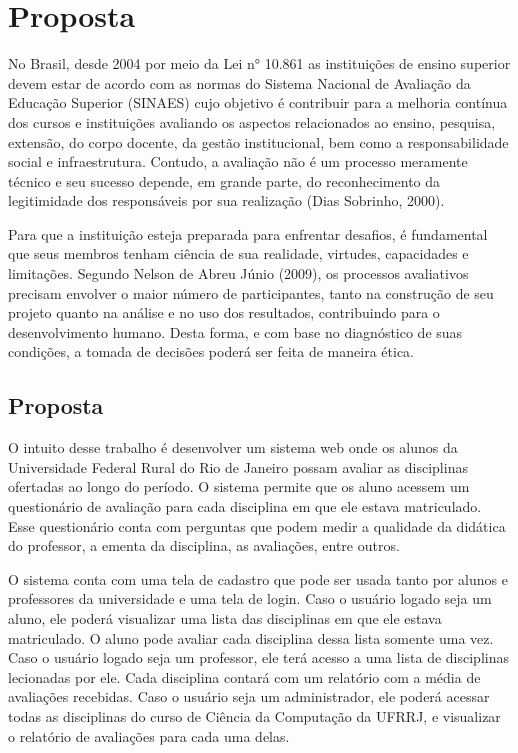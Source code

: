 \chapter{Proposta}\label{chp:PROPOSTA}

No Brasil, desde 2004 por meio da Lei n° 10.861 as instituições de ensino superior devem estar de acordo com as normas do Sistema Nacional de Avaliação da Educação Superior (SINAES)
cujo objetivo é contribuir para a melhoria contínua dos cursos e instituições avaliando 
os aspectos relacionados ao ensino, pesquisa, extensão, do corpo docente, da gestão institucional, bem como a responsabilidade social e infraestrutura.
Contudo, a avaliação não é um processo meramente técnico e seu sucesso depende, em grande parte, do reconhecimento da legitimidade dos responsáveis por sua realização (Dias Sobrinho, 2000). 

Para que a instituição esteja preparada para enfrentar desafios, é fundamental que seus membros tenham ciência de sua realidade, virtudes, capacidades e limitações.
Segundo Nelson de Abreu Júnio (2009), os processos avaliativos precisam envolver o maior número de participantes, tanto na construção de seu projeto quanto na análise e no uso dos resultados, contribuindo para o desenvolvimento humano. Desta forma, e com base no diagnóstico de suas condições, a tomada de decisões poderá ser feita de maneira ética.


\section{Proposta}
O intuito desse trabalho é desenvolver um sistema web onde os alunos da Universidade Federal Rural do Rio de Janeiro possam avaliar as disciplinas ofertadas ao longo do período. O sistema permite que os aluno acessem um questionário de avaliação para cada disciplina em que ele estava matriculado. Esse questionário conta com perguntas que podem medir a qualidade da didática do professor, a ementa da disciplina, as avaliações, entre outros.

O sistema conta com uma tela de cadastro que pode ser usada tanto por alunos e professores da universidade e uma tela de login. Caso o usuário logado seja um aluno, ele poderá visualizar uma lista das disciplinas em que ele estava matriculado. O aluno pode avaliar cada disciplina dessa lista somente uma vez. Caso o usuário logado seja um professor, ele terá acesso a uma lista de disciplinas lecionadas por ele. Cada disciplina contará com um relatório com a média de avaliações recebidas. Caso o usuário seja um administrador, ele poderá acessar todas as disciplinas do curso de Ciência da Computação da UFRRJ, e visualizar o relatório de avaliações para cada uma delas.

